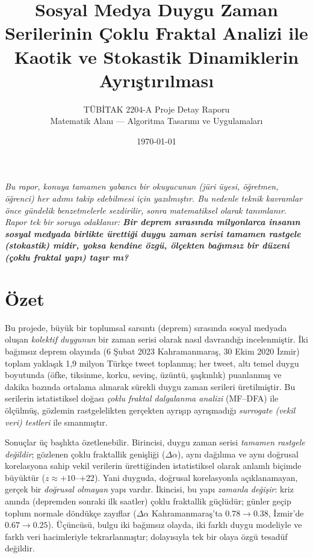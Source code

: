 \documentclass[11pt,a4paper]{article}
\title{\bfseries Sosyal Medya Duygu Zaman Serilerinin Çoklu Fraktal Analizi ile\\
Kaotik ve Stokastik Dinamiklerin Ayrıştırılması}
\author{TÜBİTAK 2204-A Proje Detay Raporu\\[3pt]
\small Matematik Alanı --- Algoritma Tasarımı ve Uygulamaları}
\date{\today}
\newcommand{\Dal}{\Delta\alpha}
\begin{document}
\maketitle

\begin{center}
\begin{minipage}{0.92\textwidth}
\small\itshape
Bu rapor, konuya tamamen yabancı bir okuyucunun (jüri üyesi, öğretmen, öğrenci)
her adımı takip edebilmesi için yazılmıştır. Bu nedenle teknik kavramlar önce
gündelik benzetmelerle sezdirilir, sonra matematiksel olarak tanımlanır.
Rapor tek bir soruya odaklanır: \textbf{Bir deprem sırasında milyonlarca
insanın sosyal medyada birlikte ürettiği duygu zaman serisi tamamen rastgele
(stokastik) midir, yoksa kendine özgü, ölçekten bağımsız bir düzeni (çoklu
fraktal yapı) taşır mı?}
\end{minipage}
\end{center}

\vspace{0.5cm}

\section*{Özet}

Bu projede, büyük bir toplumsal sarsıntı (deprem) sırasında sosyal medyada
oluşan \emph{kolektif duygunun} bir zaman serisi olarak nasıl davrandığı
incelenmiştir. İki bağımsız deprem olayında (6 Şubat 2023 Kahramanmaraş,
30 Ekim 2020 İzmir) toplam yaklaşık 1{,}9 milyon Türkçe tweet toplanmış;
her tweet, altı temel duygu boyutunda (öfke, tiksinme, korku, sevinç, üzüntü,
şaşkınlık) puanlanmış ve dakika bazında ortalama alınarak sürekli duygu zaman
serileri üretilmiştir. Bu serilerin istatistiksel doğası \emph{çoklu fraktal
dalgalanma analizi} (MF--DFA) ile ölçülmüş, gözlemin rastgelelikten gerçekten
ayrışıp ayrışmadığı \emph{surrogate (vekil veri) testleri} ile sınanmıştır.

Sonuçlar üç başlıkta özetlenebilir. Birincisi, duygu zaman serisi \emph{tamamen
rastgele değildir}; gözlenen çoklu fraktallik genişliği ($\Dal$), aynı dağılıma
ve aynı doğrusal korelasyona sahip vekil verilerin ürettiğinden istatistiksel
olarak anlamlı biçimde büyüktür ($z\approx +10$--$+22$). Yani duyguda,
doğrusal korelasyonla açıklanamayan, gerçek bir \emph{doğrusal olmayan} yapı
vardır. İkincisi, bu yapı \emph{zamanla değişir}: kriz anında (depremden
sonraki ilk saatler) çoklu fraktallik güçlüdür; günler geçip toplum normale
döndükçe zayıflar ($\Delta\alpha$ Kahramanmaraş'ta $0.78\to0.38$, İzmir'de
$0.67\to0.25$). Üçüncüsü, bulgu iki bağımsız olayda, iki farklı duygu modeliyle
ve farklı veri hacimleriyle tekrarlanmıştır; dolayısıyla tek bir olaya özgü
tesadüf değildir.
\end{document}
